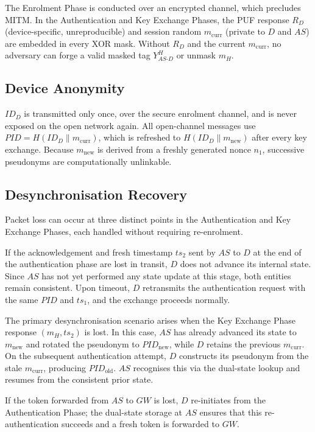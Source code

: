 \documentclass[12pt,a4paper]{report}
\begin{document}
The Enrolment Phase is conducted over an encrypted channel, which precludes MITM.
In the Authentication and Key Exchange Phases, the PUF response $R_D$
(device-specific, unreproducible) and session random $m_{\mathrm{curr}}$ (private to
$D$ and $AS$) are embedded in every XOR mask.
Without $R_D$ and the current $m_{\mathrm{curr}}$, no adversary can forge a valid
masked tag $Y_{AS\text{-}D}^H$ or unmask $m_H$.

\subsection{Device Anonymity}

$ID_D$ is transmitted only once, over the secure enrolment channel, and is never
exposed on the open network again.
All open-channel messages use $\mathit{PID} = H(ID_D \| m_{\mathrm{curr}})$,
which is refreshed to $H(ID_D \| m_{\mathrm{new}})$ after every key exchange.
Because $m_{\mathrm{new}}$ is derived from a freshly generated nonce $n_1$,
successive pseudonyms are computationally unlinkable.

\subsection{Desynchronisation Recovery}

Packet loss can occur at three distinct points in the Authentication and Key Exchange
Phases, each handled without requiring re-enrolment.

If the acknowledgement and fresh timestamp $ts_2$ sent by $AS$ to $D$ at the end of
the authentication phase are lost in transit, $D$ does not advance its internal state.
Since $AS$ has not yet performed any state update at this stage, both entities remain
consistent.
Upon timeout, $D$ retransmits the authentication request with the same $\mathit{PID}$
and $ts_1$, and the exchange proceeds normally.

The primary desynchronisation scenario arises when the Key Exchange Phase response
$(m_H, ts_2)$ is lost.
In this case, $AS$ has already advanced its state to $m_{\mathrm{new}}$ and rotated
the pseudonym to $\mathit{PID}_{\mathrm{new}}$, while $D$ retains the previous
$m_{\mathrm{curr}}$.
On the subsequent authentication attempt, $D$ constructs its pseudonym from the
stale $m_{\mathrm{curr}}$, producing $\mathit{PID}_{\mathrm{old}}$.
$AS$ recognises this via the dual-state lookup and resumes from the consistent prior
state.

If the token forwarded from $AS$ to $GW$ is lost, $D$ re-initiates from the
Authentication Phase; the dual-state storage at $AS$ ensures that this
re-authentication succeeds and a fresh token is forwarded to $GW$.
\end{document}
